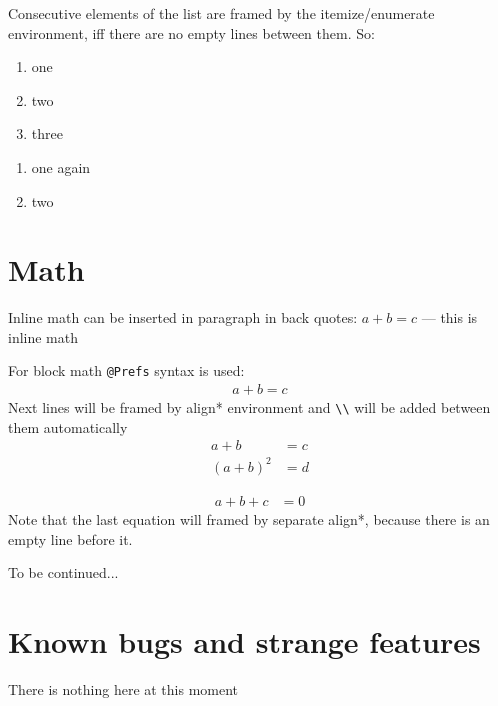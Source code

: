 \documentclass[12pt,a4paper,oneside]{article}
\begin{document}
    Consecutive elements of the list are framed by the itemize/enumerate environment, iff there are
    no empty lines between them. So:
    \begin{enumerate}
      \item one
      \item two
      \item three
    \end{enumerate}

    \begin{enumerate}
      \item one again
      \item two
    \end{enumerate}

  \section{Math}
    Inline math can be inserted in paragraph in back quotes: $a + b = c$ --- this is inline math

    For block math \texttt{@Prefs} syntax is used:
    \begin{align*}
      a + b = c
    \end{align*}
    Next lines will be framed by align* environment and \verb.\\. will be added between them
    automatically
    \begin{align*}
      a + b &= c\\
      (a + b)^2 &= d
    \end{align*}

    \begin{align*}
      a + b + c &= 0
    \end{align*}
    Note that the last equation will framed by separate align*, because there is an empty line
    before it.

  To be continued...
  \section{Known bugs and strange features}
    There is nothing here at this moment
\end{document}
